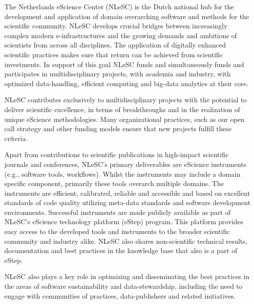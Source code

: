 \documentclass[a4paper,UKenglish]{dagrep}
\begin{document}





The Netherlands eScience Center (NLeSC) is the Dutch national hub for
the development and application of domain overarching software and
methods for the scientific community. NLeSC develops crucial bridges
between increasingly complex modern e-infrastructures and the growing
demands and ambitions of scientists from across all disciplines. The
application of digitally enhanced scientific practices makes sure that
return can be achieved from scientific investments. In support of this
goal NLeSC funds and simultaneously funds and participates in
multidisciplinary projects, with academia and industry, with optimized
data-handling, efficient computing and big-data analytics at their
core.

NLeSC contributes exclusively to multidisciplinary projects with the
potential to deliver scientific excellence, in terms of breakthroughs
and in the realization of unique eScience methodologies. Many
organizational practices, such as our open call strategy and other
funding models ensure that new projects fulfill these criteria.

Apart from contributions to scientific publications in high-impact
scientific journals and conferences, NLeSC’s primary deliverables are
eScience instruments (e.g., software tools, workflows). Whilst the
instruments may include a domain specific component, primarily these
tools overarch multiple domains. The instruments are efficient,
calibrated, reliable and accessible and based on excellent standards
of code quality utilizing meta-data standards and software development
environments. Successful instruments are made publicly available as
part of NLeSC’s eScience technology platform (eStep) program. This
platform provides easy access to the developed tools and instruments
to the broader scientific community and industry alike. NLeSC also
shares non-scientific technical results, documentation and best
practices in the knowledge base that also is a part of eStep.

NLeSC also plays a key role in optimizing and disseminating the best
practices in the areas of software sustainability and
data-stewardship, including the need to engage with communities of
practices, data-publishers and related initiatives.
\end{document}
